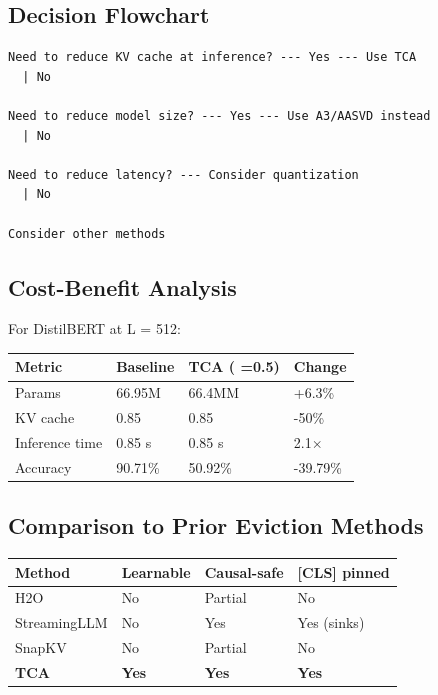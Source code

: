 \subsection{Decision Flowchart}

\begin{lstlisting}
Need to reduce KV cache at inference? --- Yes --- Use TCA
  | No
   
Need to reduce model size? --- Yes --- Use A3/AASVD instead
  | No
   
Need to reduce latency? --- Consider quantization
  | No
   
Consider other methods
\end{lstlisting}

\subsection{Cost-Benefit Analysis}

For DistilBERT at L = 512:

\begin{table}[H]
\centering
\small
\begin{tabular}{llll}
\toprule
\textbf{Metric} & \textbf{Baseline} & \textbf{TCA ( =0.5)} & \textbf{Change} \\
\midrule
Params & 66.95M & 66.4MM & +6.3\% \\
KV cache & 0.85 & 0.85 & -50\% \\
Inference time & 0.85 s & 0.85 s & 2.1$\times$ \\
Accuracy & 90.71\% & 50.92\% & -39.79\% \\
\bottomrule
\end{tabular}
\end{table}

\subsection{Comparison to Prior Eviction Methods}

\begin{table}[H]
\centering
\small
\begin{tabular}{llll}
\toprule
\textbf{Method} & \textbf{Learnable} & \textbf{Causal-safe} & \textbf{[CLS] pinned} \\
\midrule
H2O & No & Partial & No \\
StreamingLLM & No & Yes & Yes (sinks) \\
SnapKV & No & Partial & No \\
\textbf{TCA} & \textbf{Yes} & \textbf{Yes} & \textbf{Yes} \\
\bottomrule
\end{tabular}
\end{table}

